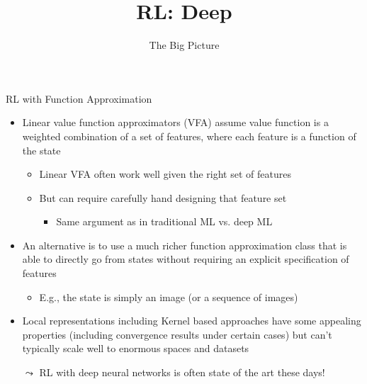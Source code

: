 


\title[RL: Deep Reinforcement Learning]{RL: Deep}
\subtitle{The Big Picture}




	
	\maketitle

\begin{frame}[c]{RL with Function Approximation}
	
	\begin{itemize}
		\item Linear value function approximators (VFA) assume value function is a weighted combination of a set of features, where each feature is a function of the state
		\begin{itemize}
		\item Linear VFA often work well given the \alert{right set of features}
		\item But can require carefully hand designing that feature set
		\begin{itemize}
			\item Same argument as in traditional ML vs. deep ML
		\end{itemize}
		\end{itemize}
		\item An alternative is to use a much richer function approximation class that is able to directly go from states without requiring an explicit specification of features
		\begin{itemize}
			\item E.g., the state is simply an image (or a sequence of images)
		\end{itemize}
		\item Local representations including Kernel based approaches have some	appealing properties (including convergence results under certain	cases) but can’t typically scale well to enormous spaces and datasets
		\item[$\leadsto$] RL with deep neural networks is often state of the art these days!
	\end{itemize}

\end{frame}
